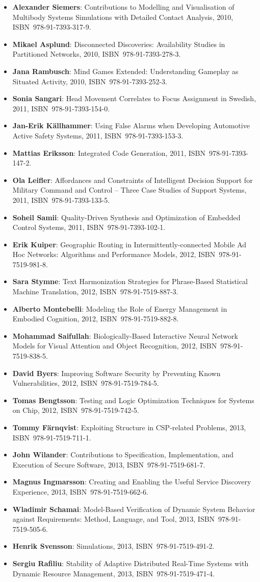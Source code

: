 \documentclass[a4paper,showtrims,twocolumn]{memoir}
\newenvironment{theses}{
  \begin{itemize}
    \setlength{\itemsep}{0.2em}
    \setlength{\parskip}{0em}
    \setlength{\parsep}{0em}
}{
  \end{itemize}
}
\newcommand{\thesis}[5]{\item[No.~#1] \textbf{#2}: #3, #4, ISBN~#5.}
\begin{document}
\begin{theses}
    \thesis{1337}{Alexander Siemers}{Contributions to Modelling and Visualisation of Multibody Systems Simulations with Detailed Contact Analysis}{2010}{978-91-7393-317-9}
    \thesis{1354}{Mikael Asplund}{Disconnected Discoveries: Availability Studies in Partitioned Networks}{2010}{978-91-7393-278-3}
    \thesis{1359}{Jana Rambusch}{Mind Games Extended: Understanding Gameplay as Situated Activity}{2010}{978-91-7393-252-3}
    \thesis{1373}{Sonia Sangari}{Head Movement Correlates to Focus Assignment in Swedish}{2011}{978-91-7393-154-0}
    \thesis{1374}{Jan-Erik Källhammer}{Using False Alarms when Developing Automotive Active Safety Systems}{2011}{978-91-7393-153-3}
    \thesis{1375}{Mattias Eriksson}{Integrated Code Generation}{2011}{978-91-7393-147-2}
    \thesis{1381}{Ola Leifler}{Affordances and Constraints of Intelligent Decision Support for Military Command and Control – Three Case Studies of Support Systems}{2011}{978-91-7393-133-5}
    \thesis{1386}{Soheil Samii}{Quality-Driven Synthesis and Optimization of Embedded Control Systems}{2011}{978-91-7393-102-1}
    \thesis{1419}{Erik Kuiper}{Geographic Routing in Intermittently-connected Mobile Ad Hoc Networks: Algorithms and Performance Models}{2012}{978-91-7519-981-8}
    \thesis{1451}{Sara Stymne}{Text Harmonization Strategies for Phrase-Based Statistical Machine Translation}{2012}{978-91-7519-887-3}
    \thesis{1455}{Alberto Montebelli}{Modeling the Role of Energy Management in Embodied Cognition}{2012}{978-91-7519-882-8}
    \thesis{1465}{Mohammad Saifullah}{Biologically-Based Interactive  Neural Network Models for Visual Attention and Object Recognition}{2012}{978-91-7519-838-5}
    \thesis{1481}{David Byers}{Improving Software Security by Preventing Known Vulnerabilities}{2012}{978-91-7519-784-5}
    \thesis{1490}{Tomas Bengtsson}{Testing and Logic Optimization Techniques for Systems on Chip}{2012}{978-91-7519-742-5}
    \thesis{1496}{Tommy Färnqvist}{Exploiting Structure in CSP-related Problems}{2013}{978-91-7519-711-1}
    \thesis{1503}{John Wilander}{Contributions to Specification, Implementation, and Execution of Secure Software}{2013}{978-91-7519-681-7}
    \thesis{1506}{Magnus Ingmarsson}{Creating and Enabling the Useful Service Discovery Experience}{2013}{978-91-7519-662-6}
    \thesis{1547}{Wladimir Schamai}{Model-Based Verification of Dynamic System Behavior against Requirements: Method, Language, and Tool}{2013}{978-91-7519-505-6}
    \thesis{1551}{Henrik Svensson}{Simulations}{2013}{978-91-7519-491-2}
    \thesis{1559}{Sergiu Rafiliu}{Stability of Adaptive Distributed Real-Time Systems with Dynamic Resource Management}{2013}{978-91-7519-471-4}

\end{theses}
\end{document}
